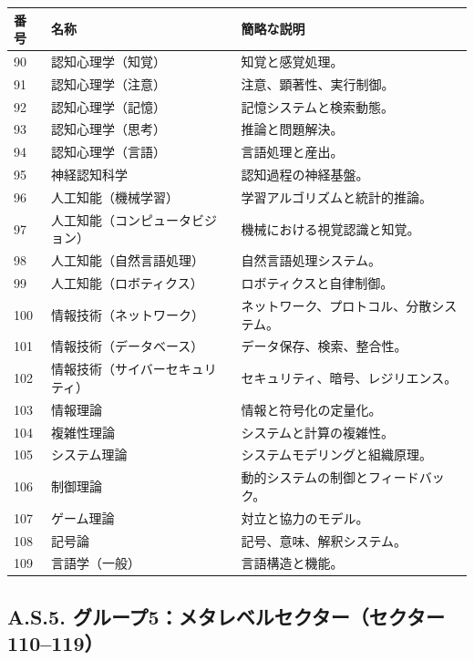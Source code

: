\documentclass[13pt,a4paper]{ltjsarticle}
\begin{document}
	\begin{longtable}{|p{0.9cm}|p{6.0cm}|p{8.6cm}|}
		\hline
		\textbf{番号} & \textbf{名称} & \textbf{簡略な説明} \\
		\hline
		\endhead
		90 & 認知心理学（知覚） & 知覚と感覚処理。 \\
		\hline
		91 & 認知心理学（注意） & 注意、顕著性、実行制御。 \\
		\hline
		92 & 認知心理学（記憶） & 記憶システムと検索動態。 \\
		\hline
		93 & 認知心理学（思考） & 推論と問題解決。 \\
		\hline
		94 & 認知心理学（言語） & 言語処理と産出。 \\
		\hline
		95 & 神経認知科学 & 認知過程の神経基盤。 \\
		\hline
		96 & 人工知能（機械学習） & 学習アルゴリズムと統計的推論。 \\
		\hline
		97 & 人工知能（コンピュータビジョン） & 機械における視覚認識と知覚。 \\
		\hline
		98 & 人工知能（自然言語処理） & 自然言語処理システム。 \\
		\hline
		99 & 人工知能（ロボティクス） & ロボティクスと自律制御。 \\
		\hline
		100 & 情報技術（ネットワーク） & ネットワーク、プロトコル、分散システム。 \\
		\hline
		101 & 情報技術（データベース） & データ保存、検索、整合性。 \\
		\hline
		102 & 情報技術（サイバーセキュリティ） & セキュリティ、暗号、レジリエンス。 \\
		\hline
		103 & 情報理論 & 情報と符号化の定量化。 \\
		\hline
		104 & 複雑性理論 & システムと計算の複雑性。 \\
		\hline
		105 & システム理論 & システムモデリングと組織原理。 \\
		\hline
		106 & 制御理論 & 動的システムの制御とフィードバック。 \\
		\hline
		107 & ゲーム理論 & 対立と協力のモデル。 \\
		\hline
		108 & 記号論 & 記号、意味、解釈システム。 \\
		\hline
		109 & 言語学（一般） & 言語構造と機能。 \\
		\hline
	\end{longtable}
	
	\subsection*{A.S.5. グループ5：メタレベルセクター（セクター110--119）}
	
\end{document}
